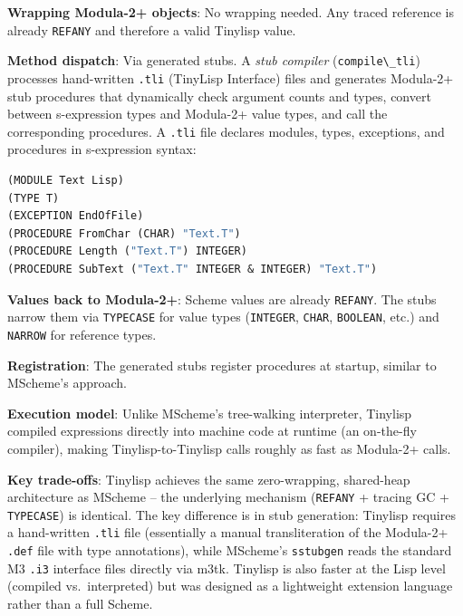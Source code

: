 \documentclass[
  12pt,
]{report}
\newcommand{\passthrough}[1]{#1}
\begin{document}
\textbf{Wrapping Modula-2+ objects}: No wrapping needed. Any traced
reference is already \passthrough{\lstinline!REFANY!} and therefore a
valid Tinylisp value.

\textbf{Method dispatch}: Via generated stubs. A \emph{stub compiler}
(\passthrough{\lstinline!compile\_tli!}) processes hand-written
\passthrough{\lstinline!.tli!} (TinyLisp Interface) files and generates
Modula-2+ stub procedures that dynamically check argument counts and
types, convert between s-expression types and Modula-2+ value types, and
call the corresponding procedures. A \passthrough{\lstinline!.tli!} file
declares modules, types, exceptions, and procedures in s-expression
syntax:

\begin{lstlisting}[language=Lisp]
(MODULE Text Lisp)
(TYPE T)
(EXCEPTION EndOfFile)
(PROCEDURE FromChar (CHAR) "Text.T")
(PROCEDURE Length ("Text.T") INTEGER)
(PROCEDURE SubText ("Text.T" INTEGER & INTEGER) "Text.T")
\end{lstlisting}

\textbf{Values back to Modula-2+}: Scheme values are already
\passthrough{\lstinline!REFANY!}. The stubs narrow them via
\passthrough{\lstinline!TYPECASE!} for value types
(\passthrough{\lstinline!INTEGER!}, \passthrough{\lstinline!CHAR!},
\passthrough{\lstinline!BOOLEAN!}, etc.) and
\passthrough{\lstinline!NARROW!} for reference types.

\textbf{Registration}: The generated stubs register procedures at
startup, similar to MScheme's approach.

\textbf{Execution model}: Unlike MScheme's tree-walking interpreter,
Tinylisp compiled expressions directly into machine code at runtime (an
on-the-fly compiler), making Tinylisp-to-Tinylisp calls roughly as fast
as Modula-2+ calls.

\textbf{Key trade-offs}: Tinylisp achieves the same zero-wrapping,
shared-heap architecture as MScheme -- the underlying mechanism
(\passthrough{\lstinline!REFANY!} + tracing GC +
\passthrough{\lstinline!TYPECASE!}) is identical. The key difference is
in stub generation: Tinylisp requires a hand-written
\passthrough{\lstinline!.tli!} file (essentially a manual
transliteration of the Modula-2+ \passthrough{\lstinline!.def!} file
with type annotations), while MScheme's
\passthrough{\lstinline!sstubgen!} reads the standard M3
\passthrough{\lstinline!.i3!} interface files directly via m3tk.
Tinylisp is also faster at the Lisp level (compiled vs.~interpreted) but
was designed as a lightweight extension language rather than a full
Scheme.
\end{document}
